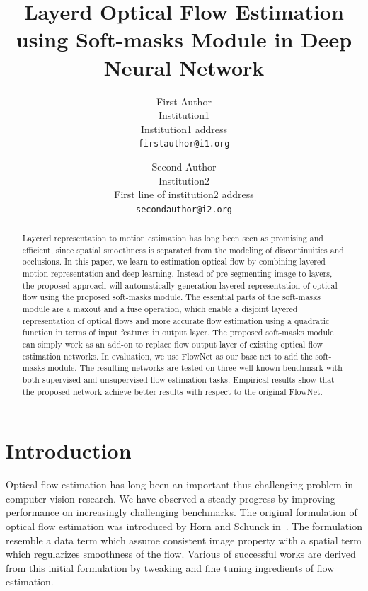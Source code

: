 \documentclass[10pt,twocolumn,letterpaper]{article}
\begin{document}
\title{Layerd Optical Flow Estimation using Soft-masks Module in Deep Neural Network}

\author{First Author\\
Institution1\\
Institution1 address\\
{\tt\small firstauthor@i1.org}
\and
Second Author\\
Institution2\\
First line of institution2 address\\
{\tt\small secondauthor@i2.org}
}

\maketitle

\begin{abstract}
Layered representation to motion estimation has long been seen as promising and efficient, since spatial smoothness is separated from the modeling of discontinuities and occlusions. In this paper, we learn to estimation optical flow by combining layered motion representation and deep learning. Instead of pre-segmenting image to layers, the proposed approach will automatically generation layered representation of optical flow using the proposed soft-masks module. The essential parts of the soft-masks module are a maxout and a fuse operation, which enable a disjoint layered representation of optical flows and more accurate flow estimation using a quadratic function in terms of input features in output layer. The proposed soft-masks module can simply work as an add-on to replace flow output layer of existing optical flow estimation networks. In evaluation, we use FlowNet as our base net to add the soft-masks module. The resulting networks are tested on three well known benchmark with both supervised and unsupervised flow estimation tasks. Empirical results show that the proposed network achieve better results with respect to the original FlowNet. 
\end{abstract}

\section{Introduction}
Optical flow estimation has long been an important thus challenging problem in computer vision research. We have observed a steady progress by improving performance on increasingly challenging benchmarks. The original formulation of optical flow estimation was introduced by Horn and Schunck in~\cite{horn1981determining}. The formulation resemble a data term which assume consistent image property with a spatial term which regularizes smoothness of the flow. Various of successful works are derived from this initial formulation by tweaking and fine tuning ingredients of flow estimation. 
\end{document}
